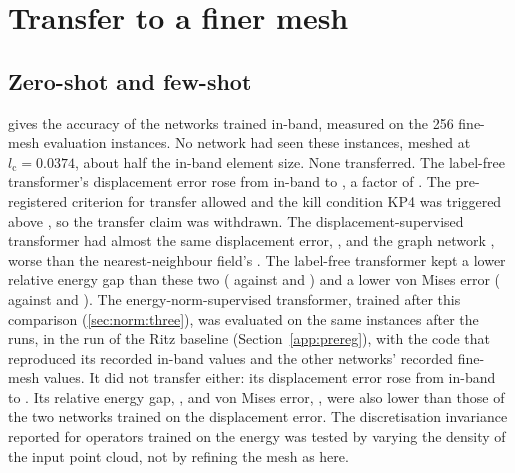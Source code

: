 \section{Transfer to a finer mesh}\label{sec:transfer}

\subsection{Zero-shot and few-shot}\label{sec:transfer:zeroshot}



 gives the accuracy of the networks trained in-band, measured on the 256
fine-mesh evaluation instances. No network had seen these instances, meshed at
$l_{\mathrm{c}}=0.0374$, about half the in-band element size. None transferred. The label-free transformer's displacement error rose from
\numAmpInDisp{} in-band to \numFineFreeDisp{}, a factor of \numFineRatio{}. The pre-registered criterion for transfer allowed \numFineWin{} and the kill condition KP4 was
triggered above \numFineKill{}, so the transfer claim was withdrawn. The
displacement-supervised transformer had almost the same displacement error,
\numFineLabDisp{}, and the graph network \numFineMgnDisp{}, worse than the nearest-neighbour
field's \numFineKnnDisp{}. The label-free transformer kept a lower relative energy gap than
these two (\numFineFreeGap{} against \numFineLabGap{} and \numFineMgnGap{}) and a lower von
Mises error (\numFineFreeVm{} against \numFineLabVm{} and \numFineMgnVm{}). The
energy-norm-supervised transformer, trained after this comparison (\cref{sec:norm:three}),
was evaluated on the same instances after the runs, in the run of the Ritz baseline
(Section~\ref{app:prereg}), with the code that reproduced its recorded in-band values and
the other networks' recorded fine-mesh values. It did not transfer either: its displacement error rose from \numThreeKnormDisp{} in-band to
\numFineKnormDisp{}. Its relative energy gap,
\numFineKnormGap{}, and von Mises error, \numFineKnormVm{}, were also lower than those of
the two networks trained on the displacement error. The discretisation
invariance reported for operators trained on the energy
\cite{Wang2026PretrainFEM,Sun2026FEVessel} was tested by varying the density of the input
point cloud, not by refining the mesh as here.

